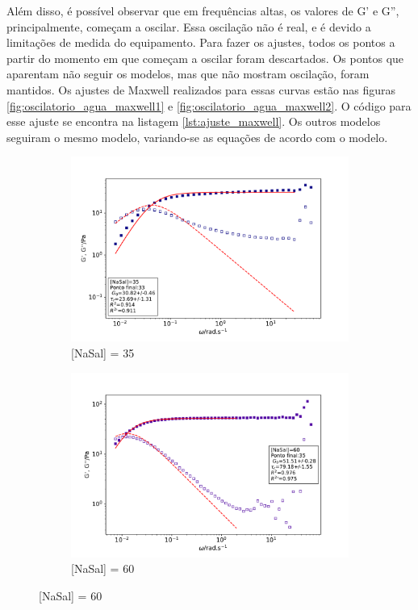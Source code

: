 		Além disso, é possível observar que em frequências altas, os valores de G' e G'', principalmente, começam a oscilar. Essa oscilação não é real, e é devido a limitações de medida do equipamento. Para fazer os ajustes, todos os pontos a partir do momento em que começam a oscilar foram descartados. Os pontos que aparentam não seguir os modelos, mas que não mostram oscilação, foram mantidos. Os ajustes de Maxwell realizados para essas curvas estão nas figuras \ref{fig:oscilatorio_agua_maxwell1} e \ref{fig:oscilatorio_agua_maxwell2}. O código para esse ajuste se encontra na listagem \ref{lst:ajuste_maxwell}. Os outros modelos seguiram o mesmo modelo, variando-se as equações de acordo com o modelo.
				
		\begin{figure}[h]
			\begin{subfigure}[t]{0.5\textwidth}
				\includegraphics[width=\textwidth]{imagens/reologia/oscilatorio_agua_35}
				\caption{[NaSal] = 35\mM}
				\label{fig:oscilatorio_agua_35}
			\end{subfigure} %
			\begin{subfigure}[t]{0.5\textwidth}
				\centering
				\includegraphics[width=\textwidth]{imagens/reologia/oscilatorio_agua_60}
				\caption{[NaSal] = 60\mM}
				\label{fig:oscilatorio_agua_60}
			\end{subfigure}
			

\end{figure}
